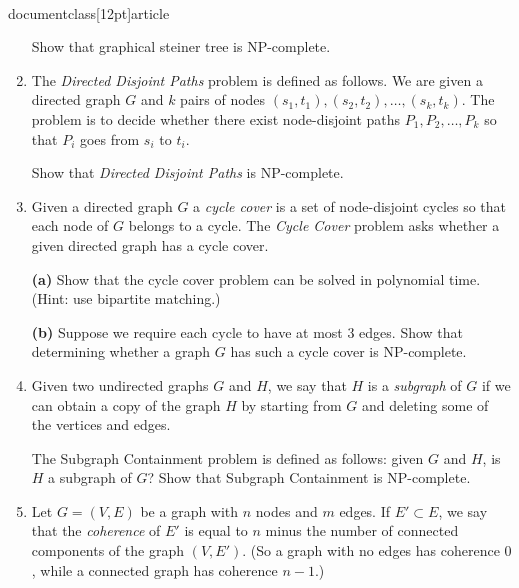 \\documentclass[12pt]{article}
\begin{document}
\begin{enumerate}
Show that {\sc graphical steiner tree} is NP-complete.



\item \label{hw-np-paths}

The {\em Directed Disjoint Paths} problem is defined as follows.
We are given a directed graph $G$ and $k$ pairs of nodes 
$(s_1, t_1), (s_2, t_2), \ldots, (s_k, t_k)$.
The problem is to decide whether there exist
node-disjoint paths $P_1, P_2, \ldots, P_k$
so that $P_i$ goes from $s_i$ to $t_i$.

Show that {\em Directed Disjoint Paths} is NP-complete.


\item 

Given a directed graph $G$ a {\em cycle cover} 
is a set of node-disjoint cycles so that each node of $G$ belongs to a cycle. 
The {\em Cycle Cover} problem asks whether a given directed
graph has a cycle cover.

{\bf (a)} Show that the cycle cover problem can be solved in polynomial time. 
(Hint: use bipartite matching.)

{\bf (b)\Star} Suppose we require each cycle to have at most $3$ edges.
Show that determining whether a graph $G$ has such a cycle cover is
NP-complete.





\item 

Given two undirected graphs $G$ and $H$, we say
that $H$ is a {\em subgraph} of $G$ if we can obtain a copy of
the graph $H$ by starting from $G$ and deleting some
of the vertices and edges.

The {\sc Subgraph Containment} problem is defined as follows:
given $G$ and $H$, is $H$ a subgraph of $G$?
Show that {\sc Subgraph Containment} is NP-complete.


\item 

Let $G = (V,E)$ be a graph
with $n$ nodes and $m$ edges.
If $E' \subset E$, we say that the {\em coherence} of
$E'$ is equal to $n$ minus the number of connected
components of the graph $(V,E')$.
(So a graph with no edges has coherence $0$,
while a connected graph has coherence $n-1$.)


\end{enumerate}
\end{document}
